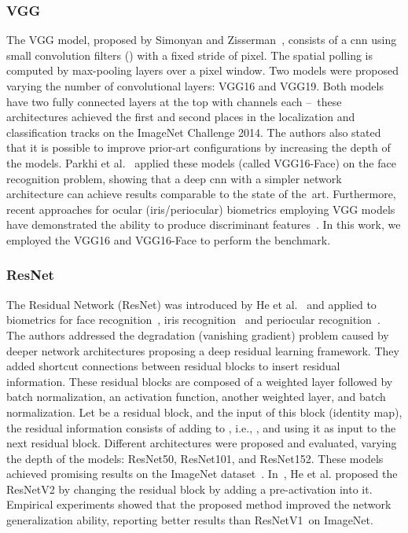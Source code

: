 \documentclass[journal]{IEEEtran}
\begin{document}
\subsubsection{\textbf{VGG}}

The VGG model, proposed by Simonyan and Zisserman~\cite{simonyan2015vgg}, consists of a \gls{cnn} using small convolution filters () with a fixed stride of  pixel.
The spatial polling is computed by  max-pooling layers over a  pixel window.
Two models were proposed varying the number of convolutional layers: VGG16 and VGG19.
Both models have two fully connected layers at the top with  channels each --~these architectures achieved the first and second places in the localization and classification tracks on the ImageNet Challenge 2014.
The authors also stated that it is possible to improve prior-art configurations by increasing the depth of the models.
Parkhi et al.~\cite{parkhi2015vggface} applied these models (called VGG16-Face) on the face recognition problem, showing that a deep \gls{cnn} with a simpler network architecture can achieve results comparable to the state of the~art.
Furthermore, recent approaches for ocular (iris/periocular) biometrics employing VGG models have demonstrated the ability to produce discriminant features~\cite{zanlorensi2018impact, silva2018multimodal, Luz2018, wang2019cross, zhao2019iriscapsule, zanlorensi2020deep, behera2020twindeep}.
In this work, we employed the VGG16 and VGG16-Face to perform the benchmark.

\subsubsection{\textbf{ResNet}}

The Residual Network (ResNet) was introduced by He et al.~\cite{he2016resnet} and applied to biometrics for face recognition~\cite{cao2017resnetface}, iris recognition~\cite{zanlorensi2018impact, boyd2019deep, zanlorensi2020deep, wang2019cross, zhao2019iriscapsule} and periocular recognition~\cite{zanlorensi2020deep, hern2020crossspectral, behera2020twindeep, boutros2020fusing}.
The authors addressed the degradation (vanishing gradient) problem caused by deeper network architectures proposing a deep residual learning framework.
They added shortcut connections between residual blocks to insert residual information.
These residual blocks are composed of a weighted layer followed by batch normalization, an activation function, another weighted layer, and batch normalization.
Let  be a residual block, and  the input of this block (identity map), the residual information consists of adding  to , i.e., , and using it as input to the next residual block.
Different architectures were proposed and evaluated, varying the depth of the models: ResNet50, ResNet101, and ResNet152.
These models achieved promising results on the ImageNet dataset~\cite{deng2009imagenet}.
In~\cite{he2016resnetv2}, He et al. proposed the ResNetV2 by changing the residual block by adding a pre-activation into it.
Empirical experiments showed that the proposed method improved the network generalization ability, reporting better results than ResNetV1~on ImageNet.
\end{document}
